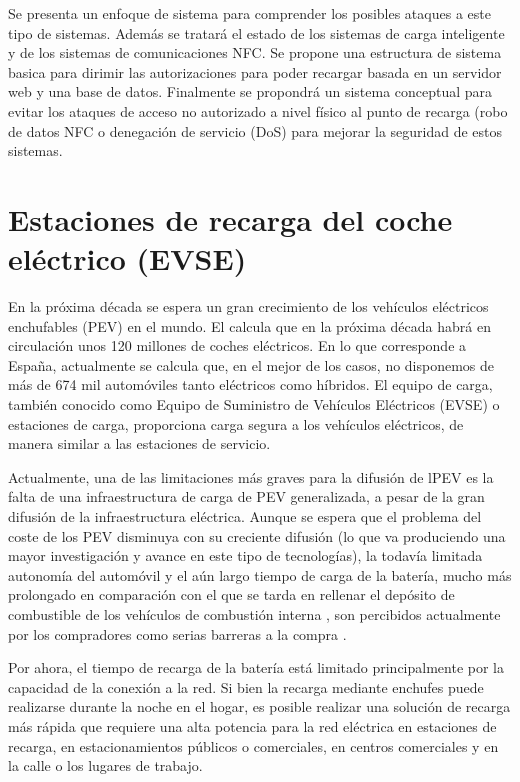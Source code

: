 \documentclass[12pt,a4paper,onecolumn,oneside]{report}
\begin{document}
Se presenta un enfoque de sistema para comprender los posibles ataques a este tipo de sistemas. Además se tratará el estado de los sistemas de carga inteligente y de los sistemas de comunicaciones NFC. Se propone una estructura de sistema basica para dirimir las autorizaciones para poder recargar basada en un servidor web y una base de datos. Finalmente se propondrá un sistema conceptual para evitar los ataques de acceso no autorizado a nivel físico al punto de recarga (robo de datos NFC o denegación de servicio (DoS) para mejorar la seguridad de estos sistemas.

\chapter{Estaciones de recarga del coche eléctrico (EVSE)}
\label{Estaciones de recarga del coche eléctrico (EVSE)}

En la próxima década se espera un gran crecimiento de los vehículos eléctricos enchufables (PEV) en el mundo. El calcula que en la próxima década habrá en circulación unos 120 millones de coches eléctricos. En lo que corresponde a España, actualmente se calcula que, en el mejor de los casos, no disponemos de más de 674 mil automóviles tanto eléctricos como híbridos. El equipo de carga, también conocido como Equipo de Suministro de Vehículos Eléctricos (EVSE) o estaciones de carga, proporciona carga segura a los vehículos eléctricos, de manera similar a las estaciones de servicio. 

Actualmente, una de las limitaciones más graves para la difusión de lPEV es la falta de una infraestructura de carga de PEV generalizada, a pesar de la gran difusión de la infraestructura eléctrica. Aunque se espera que el problema del coste de los PEV disminuya con su creciente difusión (lo que va produciendo una mayor investigación y avance en este tipo de tecnologías), la todavía limitada autonomía del automóvil y el aún largo tiempo de carga de la batería, mucho más prolongado en comparación con el que se tarda en rellenar el depósito de combustible de los vehículos de combustión interna \cite{diezuno}, son percibidos actualmente por los compradores como serias barreras a la compra \cite{diezdos}\cite{dieztres}.

Por ahora, el tiempo de recarga de la batería está limitado principalmente por la capacidad de la conexión a la red. Si bien la recarga mediante enchufes puede realizarse durante la noche en el hogar, es posible realizar una solución de recarga más rápida que requiere una alta potencia para la red eléctrica en estaciones de recarga, en estacionamientos públicos o comerciales, en centros comerciales y en la calle o los lugares de trabajo.
\end{document}
